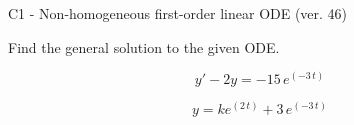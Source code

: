 \begin{exercise}
  \begin{exerciseTitle}C1 - Non-homogeneous first-order linear ODE (ver. 46)\end{exerciseTitle}
  \begin{exerciseStatement}
    
Find the general solution to the given ODE.

    
\[y'-2y= -15 \, e^{\left(-3 \, t\right)}\]

  \end{exerciseStatement}
  \begin{exerciseAnswer}
    
\[y= k e^{\left(2 \, t\right)} + 3 \, e^{\left(-3 \, t\right)}\]

  \end{exerciseAnswer}
\end{exercise}